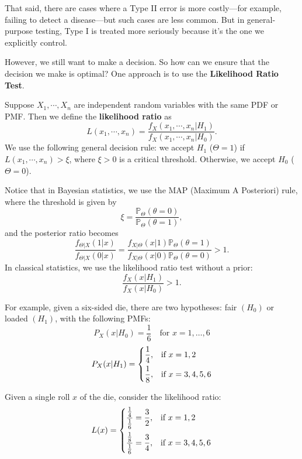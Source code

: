 That said, there are cases where a Type II error is more costly—for example, failing to detect a disease—but such cases are less common. But in general-purpose testing, Type I is treated more seriously because it’s the one we explicitly control.

However, we still want to make a decision. So how can we ensure that the decision we make is optimal? One approach is to use the \textbf{Likelihood Ratio Test}.

Suppose \(X_1, \cdots, X_n\) are independent random variables with the same PDF or PMF. Then we define the \textbf{likelihood ratio} as  
\[
  L(x_1, \cdots, x_n) = \dfrac{f_X(x_1, \cdots, x_n \vert H_1)}{f_X(x_1, \cdots, x_n \vert H_0)}.
\]
We use the following general decision rule: we accept \(H_1\) (\(\Theta = 1\)) if \(L(x_1, \cdots, x_n) > \xi\), where \(\xi > 0\) is a critical threshold. Otherwise, we accept \(H_0\) (\(\Theta = 0\)).

\begin{remark}
  Notice that in Bayesian statistics, we use the MAP (Maximum A Posteriori) rule, where the threshold is given by
  \[
    \xi = \dfrac{\mathbb{P}_{\Theta}(\theta = 0)}{\mathbb{P}_{\Theta}(\theta = 1)},
  \]
  and the posterior ratio becomes
  \[
    \dfrac{f_{\Theta \vert X}(1 \vert x)}{f_{\Theta \vert X}(0 \vert x)} 
    = \dfrac{f_{X \vert \Theta}(x \vert 1)\mathbb{P}_{\Theta}(\theta = 1)}{f_{X \vert \Theta}(x \vert 0)\mathbb{P}_{\Theta}(\theta = 0)} > 1.
  \]
  In classical statistics, we use the likelihood ratio test without a prior:
  \[
    \dfrac{f_X(x \vert H_1)}{f_X(x \vert H_0)} > 1.
  \]
\end{remark}

For example, given a six-sided die, there are two hypotheses: fair \((H_0)\) or loaded \((H_1)\), with the following PMFs: 
\[
  P_X(x \vert H_0) = \frac{1}{6} \quad \text{for } x = 1, \dots, 6
\]
\[
  P_X(x \vert H_1) = 
  \begin{dcases}
    \frac{1}{4}, &\text{if } x = 1, 2 \\
    \frac{1}{8}, &\text{if } x = 3, 4, 5, 6
  \end{dcases}
\]

Given a single roll \(x\) of the die, consider the likelihood ratio:
\[
  L(x) = 
  \begin{dcases}
    \dfrac{\frac{1}{4}}{\frac{1}{6}} = \frac{3}{2}, &\text{if } x = 1, 2 \\
    \dfrac{\frac{1}{8}}{\frac{1}{6}} = \frac{3}{4}, &\text{if } x = 3, 4, 5, 6
  \end{dcases}
\]

